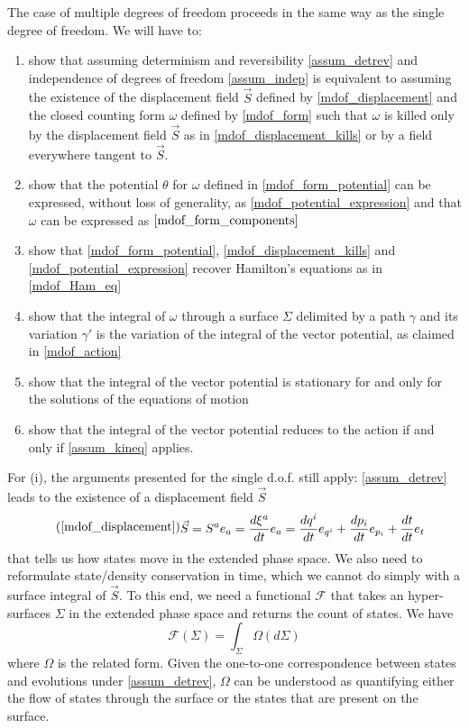 \documentclass[10pt,twocolumn, nofootinbib]{revtex4-2}
\begin{document}
The case of multiple degrees of freedom proceeds in the same way as the single degree of freedom. We will have to:
\begin{enumerate}[label=(\roman*)]
	\item show that assuming determinism and reversibility \ref{assum_detrev} and independence of degrees of freedom \ref{assum_indep} is equivalent to assuming the existence of the displacement field $\vec{S}$ defined by \ref{mdof_displacement} and the closed counting form $\omega$ defined by \ref{mdof_form} such that $\omega$ is killed only by the displacement field $\vec{S}$ as in \ref{mdof_displacement_kills} or by a field everywhere tangent to $\vec{S}$.
	\item show that the potential $\theta$ for $\omega$ defined in \ref{mdof_form_potential} can be expressed, without loss of generality, as \ref{mdof_potential_expression} and that $\omega$ can be expressed as $\ref{mdof_form_components}$
	\item show that \ref{mdof_form_potential}, \ref{mdof_displacement_kills} and \ref{mdof_potential_expression} recover Hamilton's equations as in \ref{mdof_Ham_eq}
	\item show that the integral of $\omega$ through a surface $\Sigma$ delimited by a path $\gamma$ and its variation $\gamma'$ is the variation of the integral of the vector potential, as claimed in \ref{mdof_action}
	\item show that the integral of the vector potential is stationary for and only for the solutions of the equations of motion
	\item show that the integral of the vector potential reduces to the action if and only if \ref{assum_kineq} applies.
\end{enumerate}

For (i), the arguments presented for the single d.o.f. still apply: \ref{assum_detrev} leads to the existence of a displacement field $\vec{S}$
\begin{equation}
\tag*{(\ref{mdof_displacement})}
	\begin{aligned}
		\vec{S} &= S^a e_a = \frac{d\xi^a}{dt} e_a =\frac{dq^i}{dt} e_{q^i} + \frac{dp_i}{dt} e_{p_i} + \frac{dt}{dt} e_t
	\end{aligned}
\end{equation}
that tells us how states move in the extended phase space. We also need to reformulate state/density conservation in time, which we cannot do simply with a surface integral of $\vec{S}$. To this end, we need a functional $\mathcal{F}$ that takes an hyper-surfaces $\Sigma$ in the extended phase space and returns the count of states. We have 
\begin{equation}
	\mathcal{F}(\Sigma) = \int_\Sigma \Omega(d\Sigma)
\end{equation}
where $\Omega$ is the related form. Given the one-to-one correspondence between states and evolutions under \ref{assum_detrev}, $\Omega$ can be understood as quantifying either the flow of states through the surface or the states that are present on the surface.
\end{document}
